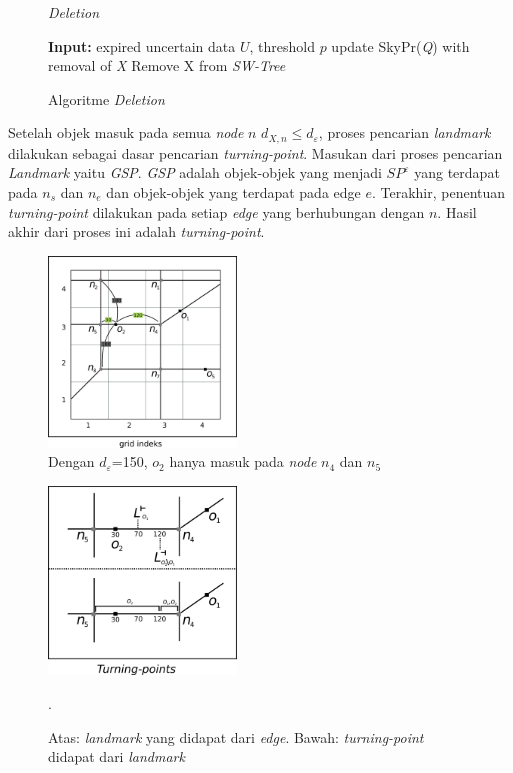 \documentclass[conference]{IEEEtran}
\begin{document}
	\begin{figure}[H]
		\begin{algorithm}[H]
			\label{algo:deletion}
			\caption{\textit{Deletion}}
			\begin{algorithmic}[1]
				\State \textbf{Input: }expired uncertain data $ U $, threshold $ p $
				\State update SkyPr(\textit{Q}) with removal of \textit{X}
				\EndFor
				\State Remove X from \textit{SW-Tree}
			\end{algorithmic}
		\end{algorithm}
		\caption{Algoritme \textit{Deletion}}
	\end{figure}


Setelah objek masuk pada semua \textit{node} $ n $ $ d_{X, n} \le d_\varepsilon $, proses pencarian \textit{landmark} dilakukan sebagai dasar pencarian \textit{turning-point}. Masukan dari proses pencarian \textit{Landmark} yaitu \textit{GSP}. \textit{GSP} adalah objek-objek yang menjadi $ SP^\varepsilon $ yang terdapat pada $ n_s $ dan $ n_e $ dan objek-objek yang terdapat pada edge $ e $. Terakhir, penentuan \textit{turning-point} dilakukan pada setiap \textit{edge} yang berhubungan dengan $ n $. Hasil akhir dari proses ini adalah \textit{turning-point}.

\begin{figure}
	\centering
	\includegraphics[width=5cm]{img/alur/alur3.png}
	\caption{Dengan $ d_\varepsilon $=150, $ o_2 $ hanya masuk pada \textit{node} $ n_4 $ dan $ n_5 $}
	\label{fig:alur3}
\end{figure}

\begin{figure}
	\centering
	\includegraphics[width=5cm]{img/alur/alur6.png}
	\caption{Atas: \textit{landmark} yang didapat dari \textit{edge}. Bawah: \textit{turning-point} didapat dari \textit{landmark}}.
	\label{fig:alur4-5}
\end{figure}
\end{document}
